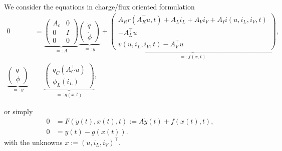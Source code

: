 We consider the equations in charge/flux oriented formulation
\begin{align*}
	0 &=
	\underbrace{ 
	\left( \begin{matrix}
		A_c & 0 \\
		0 & I \\
		0 & 0
	\end{matrix} \right)}_{=:A}
	\underbrace{
	\left( \begin{matrix}
		\dot{q} \\
		\dot{\phi} 
	\end{matrix} \right)}_{=:\dot{y}}
	+
	\underbrace{
	\left( \begin{matrix}
		A_R r(A_R^\top u,t) + A_L i_L + A_V i_V + A_I i(u, i_L, i_V, t) \\
		- A_L^\top u \\
		v(u, i_L, i_V, t) - A_V^\top u
	\end{matrix} \right)}_{=:f(x,t)}, \\
	\underbrace{
	\left( \begin{matrix}
		q \\
		\phi 
	\end{matrix} \right)}_{=:y} 
	&=
	\underbrace{
	\left( \begin{matrix}
		q_C(A_C^\top u) \\
		\phi_L(i_L) 
	\end{matrix} \right)}_{=:g(x,t)},
\end{align*}

or simply
\begin{align*}
	0 &= F(\dot{y}(t), x(t), t) :=A \dot{y}(t) + f(x(t),t), \\
	0 &= y(t) - g(x(t)).
\end{align*}
with the unknowns $x:=(u, i_L, i_V)^\top$.

